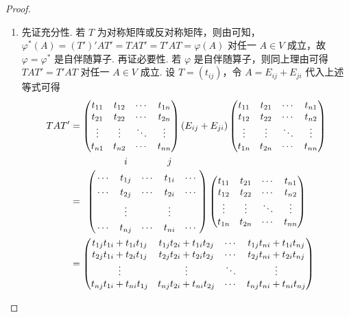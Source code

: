 \documentclass[../../main.tex]{subfiles}
\begin{document}
\begin{proof}
\begin{enumerate}[(1)]
\item 先证充分性. 若 \(T\) 为对称矩阵或反对称矩阵，则由可知，\(\varphi^*(A)=(T')'AT'=TAT'=T'AT=\varphi(A)\) 对任一 \(A\in V\) 成立，故 \(\varphi = \varphi^*\) 是自伴随算子.
再证必要性. 若 \(\varphi\) 是自伴随算子，则同上理由可得 \(TAT' = T'AT\) 对任一 \(A\in V\) 成立. 设 \(T=(t_{ij})\)，令 \(A = E_{ij}+E_{ji}\) 代入上述等式可得
\begin{align}
TAT' &= \begin{pmatrix}
t_{11} & t_{12} & \cdots & t_{1n} \\
t_{21} & t_{22} & \cdots & t_{2n} \\
\vdots & \vdots & \ddots & \vdots \\
t_{n1} & t_{n2} & \cdots & t_{nn} \\
\end{pmatrix}
(E_{ij}+E_{ji})
\begin{pmatrix}
t_{11} & t_{21} & \cdots & t_{n1} \\
t_{12} & t_{22} & \cdots & t_{n2} \\
\vdots & \vdots & \ddots & \vdots \\
t_{1n} & t_{2n} & \cdots & t_{nn} \\
\end{pmatrix}
\nonumber
\\
&= \bordermatrix{%
&    &    i&       &   j&  \cr
& \cdots & t_{1j} & \cdots & t_{1i} & \cdots \cr
&\cdots & t_{2j} & \cdots & t_{2i} & \cdots \cr
&  & \vdots&  &\vdots &\cr
&\cdots & t_{nj} & \cdots & t_{ni} & \cdots \cr
}
\begin{pmatrix}
t_{11} & t_{21} & \cdots & t_{n1} \\
t_{12} & t_{22} & \cdots & t_{n2} \\
\vdots & \vdots & \ddots & \vdots \\
t_{1n} & t_{2n} & \cdots & t_{nn} \\
\end{pmatrix}
\nonumber
\\
&= \begin{pmatrix}
t_{1j}t_{1i} + t_{1i}t_{1j} & t_{1j}t_{2i} + t_{1i}t_{2j} & \cdots & t_{1j}t_{ni} + t_{1i}t_{nj} \\
t_{2j}t_{1i} + t_{2i}t_{1j} & t_{2j}t_{2i} + t_{2i}t_{2j} & \cdots & t_{2j}t_{ni} + t_{2i}t_{nj} \\
\vdots & \vdots & \ddots & \vdots \\
t_{nj}t_{1i} + t_{ni}t_{1j} & t_{nj}t_{2i} + t_{ni}t_{2j} & \cdots & t_{nj}t_{ni} + t_{ni}t_{nj} \\

\end{pmatrix}
\end{align}
\end{enumerate}
\end{proof}
\end{document}
